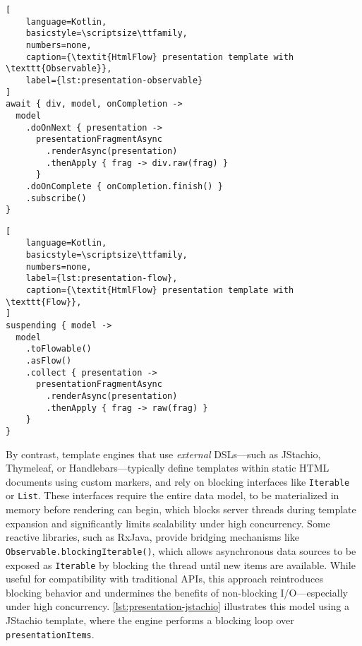 \lstset{style=listingstyle}
\begin{center}
\begin{minipage}{0.50\textwidth}
\begin{lstlisting}[
    language=Kotlin,
    basicstyle=\scriptsize\ttfamily,
    numbers=none,
    caption={\textit{HtmlFlow} presentation template with \texttt{Observable}},
    label={lst:presentation-observable}
]
await { div, model, onCompletion ->
  model
    .doOnNext { presentation ->
      presentationFragmentAsync
        .renderAsync(presentation)
        .thenApply { frag -> div.raw(frag) }
      }
    .doOnComplete { onCompletion.finish() }
    .subscribe()
}
\end{lstlisting}
\end{minipage}
\hfill
\begin{minipage}{0.46\textwidth}
\begin{lstlisting}[
    language=Kotlin,
    basicstyle=\scriptsize\ttfamily,
    numbers=none,
    label={lst:presentation-flow},
    caption={\textit{HtmlFlow} presentation template with \texttt{Flow}},
]
suspending { model ->
  model
    .toFlowable()
    .asFlow()
    .collect { presentation ->
      presentationFragmentAsync
        .renderAsync(presentation)
        .thenApply { frag -> raw(frag) }
    }
}
\end{lstlisting}
\end{minipage}
\end{center}

By contrast, template engines that use \textit{external} DSLs—such as JStachio,
Thymeleaf, or Handlebars—typically define templates within static HTML
documents using custom markers, and rely on blocking interfaces like
\texttt{Iterable} or \texttt{List}. These interfaces require the entire data
model, to be materialized in memory before rendering can begin, which blocks server
threads during template expansion and significantly limits scalability under
high concurrency.
Some reactive libraries, such as RxJava, provide bridging mechanisms like
\texttt{Observable.blockingIterable()}, which allows asynchronous data sources
to be exposed as \texttt{Iterable} by blocking the thread until new items are available.
While useful for compatibility with traditional APIs, this approach
reintroduces blocking behavior and undermines the benefits of non-blocking
I/O—especially under high concurrency. \autoref{lst:presentation-jstachio}
illustrates this model using a JStachio template, where the engine performs a
blocking loop over \texttt{presentationItems}.

